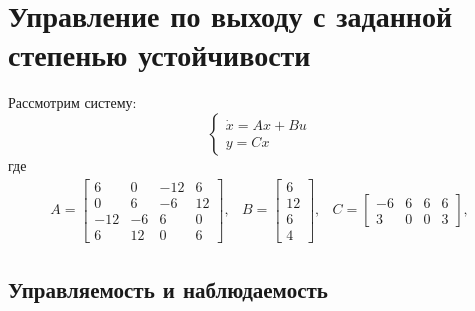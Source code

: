 \section{Управление по выходу с заданной степенью устойчивости}

Рассмотрим систему: 
\begin{equation}
    \begin{cases}
        \dot{x} = Ax + Bu \\
        y = Cx 
    \end{cases}
\end{equation} 
где
\begin{equation}
    \begin{array}{cccc}
        A = \begin{bmatrix}
            6 & 0 & -12 & 6 \\ 
            0 & 6 & -6 & 12 \\
            -12 & -6 & 6 & 0 \\
            6 & 12 & 0 & 6
        \end{bmatrix}, & 
        B = \begin{bmatrix}
            6 \\ 12 \\ 6 \\ 4
        \end{bmatrix}, & 
        C = \begin{bmatrix}
            -6 & 6 & 6 & 6 \\
            3 & 0 & 0 & 3
        \end{bmatrix}, 
    \end{array}
\end{equation}

\subsection{Управляемость и наблюдаемость}


